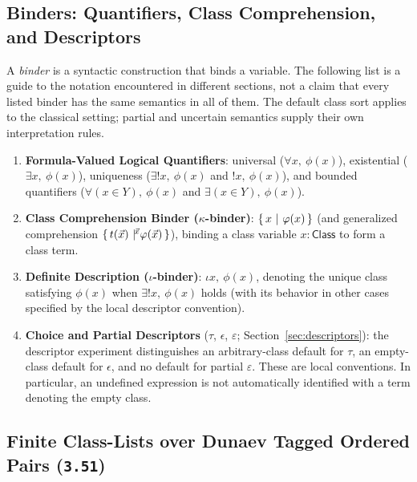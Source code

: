 \subsection{Binders: Quantifiers, Class Comprehension, and Descriptors}
\label{subsec:binders_overview}

A \emph{binder} is a syntactic construction that binds a variable.
The following list is a guide to the notation encountered in different
sections, not a claim that every listed binder has the same semantics in
all of them. The default class sort applies to the classical setting;
partial and uncertain semantics supply their own interpretation rules.
\begin{enumerate}
  \item \textbf{Formula-Valued Logical Quantifiers}: universal ($\forall x,\ \phi(x)$), existential ($\exists x,\ \phi(x)$), uniqueness ($\exists! x,\ \phi(x)$ and $!x,\ \phi(x)$), and bounded quantifiers ($\forall (x \in Y),\ \phi(x)$ and $\exists (x \in Y),\ \phi(x)$).
  \item \textbf{Class Comprehension Binder ($\kappa$-binder)}: $\left\{\,x\ \middle|\ \varphi(x)\,\right\}$ (and generalized comprehension $\ccc{\vec{x}}{t(\vec{x})}{\phi(\vec{x})}$), binding a class variable $x:\mathsf{Class}$ to form a class term.
  \item \textbf{Definite Description ($\iota$-binder)}: $\iota x,\ \phi(x)$, denoting the unique class satisfying $\phi(x)$ when $\exists! x,\ \phi(x)$ holds (with its behavior in other cases specified by the local descriptor convention).
  \item \textbf{Choice and Partial Descriptors} ($\tau$, $\epsilon$,
  $\varepsilon$; Section~\ref{sec:descriptors}): the descriptor experiment
  distinguishes an arbitrary-class default for $\tau$, an empty-class
  default for $\epsilon$, and no default for partial $\varepsilon$.
  These are local conventions. In particular, an undefined expression is
  not automatically identified with a term denoting the empty class.
\end{enumerate}

\subsection{Finite Class-Lists over Dunaev Tagged Ordered Pairs (\texttt{3.51})}
\label{subsec:class_lists_dunaev}

